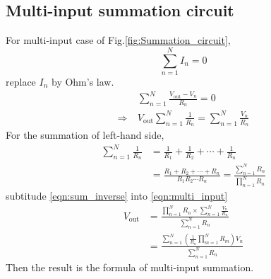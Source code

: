 \documentclass[a4paper, 12pt, AutoFakeBold]{report}
\newcommand{\figref}[1]{Fig.\ref{#1}}
\begin{document}
    \begin{appendices}

    \chapter{Multi-input summation circuit}
    For multi-input case of \figref{fig:Summation_circuit},
    \begin{equation}
        \sum\limits_{n=1}^N I_n = 0
    \end{equation}
    replace $I_n$ by Ohm's law.
    \begin{align}
        &\sum\limits_{n=1}^N \frac{V_\text{out}-V_n}{R_n} = 0 \nonumber \\
        \Rightarrow\ &V_\text{out}\sum\limits_{n=1}^N\frac{1}{R_n} = \sum\limits_{n=1}^N\frac{V_n}{R_n}
        \label{eqn:multi_input}
    \end{align}
    For the summation of left-hand side,
    \begin{align}
        \sum\limits_{n=1}^N\frac{1}{R_n} &= \frac{1}{R_1}+\frac{1}{R_2}+\cdots+\frac{1}{R_n} \nonumber \\
        &= \frac{R_1+R_2+\cdots+R_n}{R_1R_2\cdots R_n} = \frac{\sum\limits_{n=1}^N R_n}{\prod\limits_{n=1}^N R_n}
        \label{eqn:sum_inverse}
    \end{align}
    subtitude \eqref{eqn:sum_inverse} into \eqref{eqn:multi_input}
    \begin{align}
        V_\text{out} &= \frac{\prod\limits_{n=1}^NR_n\times\sum\limits_{n=1}^N\frac{V_n}{R_n}}{\sum\limits_{n=1}^N R_n} \nonumber \\
        &= \frac{\sum\limits_{n=1}^N(\frac{1}{R_n}\prod\limits_{m=1}^NR_m)V_n}{\sum\limits_{n=1}^N R_n}
    \end{align}
    Then the result is the formula of multi-input summation.

    \end{appendices}
\end{document}
